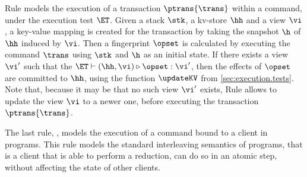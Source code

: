 Rule  models the execution of a transaction $\ptrans{\trans}$ within a command, under the execution 
test $\ET$. Given a stack $\stk$, a 
kv-store $\hh$ and a view $\vi$, a key-value mapping is created for the transaction by taking the 
snapshot $\h$ of $\hh$ induced by $\vi$. Then a fingerprint $\opset$ is calculated by executing the command $\trans$ using 
$\stk$ and $\h$ as an initial state. If there exists a view $\vi'$ such that the $\ET \vdash (\hh, \vi) \triangleright \opset : \vi'$, 
then the effects of $\opset$ are committed to $\hh$, using the function $\updateKV$ from \cref{sec:execution.tests}. 
Note that, because it may be that no such view $\vi'$ exists, Rule  allows to update the view $\vi$ to a 
newer one, before executing the transaction $\ptrans{\trans}$.

The last rule, , models the execution of a command bound to a client in programs. 
This rule models the standard interleaving semantics of programs, that is a client that is able to 
perform a reduction, can do so in an atomic step, without affecting the state of other clients.

